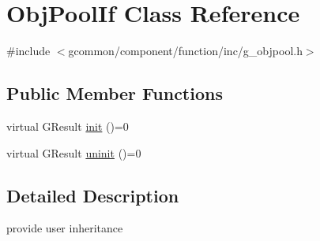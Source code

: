 \hypertarget{class_obj_pool_if}{\section{Obj\-Pool\-If Class Reference}
\label{class_obj_pool_if}
}


{\ttfamily \#include $<$gcommon/component/function/inc/g\-\_\-objpool.\-h$>$}

\subsection*{Public Member Functions}
\begin{DoxyCompactItemize}
\item 
virtual G\-Result \hyperlink{class_obj_pool_if_a889158beb58daea8e4b245bdeb443975}{init} ()=0
\item 
virtual G\-Result \hyperlink{class_obj_pool_if_a5ea166cacebe99ed10d71440277a9243}{uninit} ()=0
\end{DoxyCompactItemize}


\subsection{Detailed Description}
provide user inheritance 

